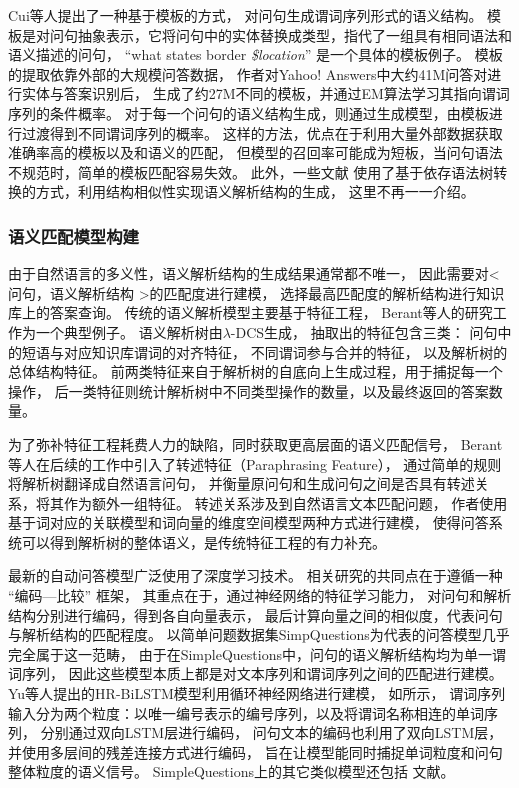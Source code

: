 Cui等人\cite{cui2017kbqa}提出了一种基于模板的方式，
对问句生成谓词序列形式的语义结构。
模板是对问句抽象表示，它将问句中的实体替换成类型，指代了一组具有相同语法和语义描述的问句，
``what states border \textit{\$location}'' 是一个具体的模板例子。
模板的提取依靠外部的大规模问答数据，
作者对Yahoo! Answers中大约41M问答对进行实体与答案识别后，
生成了约27M不同的模板，并通过EM算法学习其指向谓词序列的条件概率。
对于每一个问句的语义结构生成，则通过生成模型，由模板进行过渡得到不同谓词序列的概率。
这样的方法，优点在于利用大量外部数据获取准确率高的模板以及和语义的匹配，
但模型的召回率可能成为短板，当问句语法不规范时，简单的模板匹配容易失效。
此外，一些文献\parencite{reddy2016transforming,hu2018answering}
使用了基于依存语法树转换的方式，利用结构相似性实现语义解析结构的生成，
这里不再一一介绍。


\subsubsection{语义匹配模型构建}    %

由于自然语言的多义性，语义解析结构的生成结果通常都不唯一，
因此需要对\textless 问句，语义解析结构 \textgreater 的匹配度进行建模，
选择最高匹配度的解析结构进行知识库上的答案查询。
传统的语义解析模型主要基于特征工程，
Berant等人\cite{berant2013semantic}的研究工作为一个典型例子。
语义解析树由$\lambda$-DCS生成，
抽取出的特征包含三类：
问句中的短语与对应知识库谓词的对齐特征，
不同谓词参与合并的特征，
以及解析树的总体结构特征。
前两类特征来自于解析树的自底向上生成过程，用于捕捉每一个操作，
后一类特征则统计解析树中不同类型操作的数量，以及最终返回的答案数量。

为了弥补特征工程耗费人力的缺陷，同时获取更高层面的语义匹配信号，
Berant等人在后续的工作\parencite{berant2014semantic}中引入了转述特征（Paraphrasing Feature），
通过简单的规则将解析树翻译成自然语言问句，
并衡量原问句和生成问句之间是否具有转述关系，将其作为额外一组特征。
转述关系涉及到自然语言文本匹配问题，
作者使用基于词对应的关联模型和词向量的维度空间模型两种方式进行建模，
使得问答系统可以得到解析树的整体语义，是传统特征工程的有力补充。

最新的自动问答模型广泛使用了深度学习技术。
相关研究的共同点在于遵循一种 ``{编码—比较}'' 框架，
其重点在于，通过神经网络的特征学习能力，
对问句和解析结构分别进行编码，得到各自向量表示，
最后计算向量之间的相似度，代表问句与解析结构的匹配程度。
以简单问题数据集SimpQuestions为代表的问答模型几乎完全属于这一范畴，
由于在SimpleQuestions中，问句的语义解析结构均为单一谓词序列，
因此这些模型本质上都是对文本序列和谓词序列之间的匹配进行建模。
Yu等人\cite{yu2017improved}提出的HR-BiLSTM模型利用循环神经网络进行建模，
如所示，
谓词序列输入分为两个粒度：以唯一编号表示的编号序列，以及将谓词名称相连的单词序列，
分别通过双向LSTM层进行编码，
问句文本的编码也利用了双向LSTM层，并使用多层间的残差连接方式进行编码，
旨在让模型能同时捕捉单词粒度和问句整体粒度的语义信号。
SimpleQuestions上的其它类似模型还包括
文献\parencite{lukovnikov2017neural,yin2016simple,golub2016character,qu2018question}。

